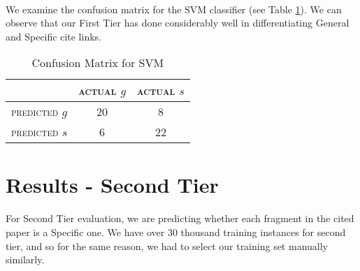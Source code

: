 \paragraph{}
We examine the confusion matrix for the SVM classifier (see Table \ref{tab:svmconfusionmatrix}). We can observe that our First Tier has done considerably well in differentiating General and Specific cite links.

\begin{table}[h]
	\center
	\begin{tabular}{ c | c  c }
		 & \textsc{actual $g$} & \textsc{actual $s$} \\
		\hline
		\textsc{predicted $g$} 	& 20 & 8 \\
		\textsc{predicted $s$}		& 6 & 22
	\end{tabular}
	\caption{Confusion Matrix for SVM}
	\label{tab:svmconfusionmatrix}
\end{table}

\section{Results - Second Tier}
\paragraph{}
For Second Tier evaluation, we are predicting whether each fragment in the cited paper is a Specific one. We have over 30 thousand training instances for second tier, and so for the same reason, we had to select our training set manually similarly.
